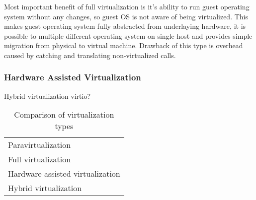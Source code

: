 Most important benefit of full virtualization is it's ability to run guest operating system without any changes, so guest \Ac{OS} is not aware of being virtualized. This makes guest operating system fully abstracted from underlaying hardware, it is possible to multiple different operating system on single host and provides simple migration from physical to virtual machine. Drawback of this type is overhead caused by catching and translating non-virtualized calls. 

\subsubsection{Hardware Assisted Virtualization}

Hybrid virtualization
virtio?



\begin{table}[htb]
\begin{center}
	\caption{Comparison of virtualization types}
	\label{tab:virtualization-types}
	\begin{tabular}{|l|}
	\hline
	\Th{Type} \\
	\hline
	Paravirtualization \\
	\hline
	Full virtualization \\
	\hline
	Hardware assisted virtualization \\
	\hline
	Hybrid virtualization \\
	\hline
	\end{tabular}
\end{center}
\end{table}

